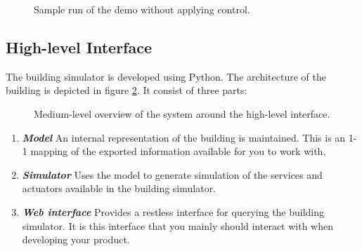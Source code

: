 \documentclass[10pt]{article}
\newcommand{\includeSVG}[1]{
  \texttt{[image: figs/\#1.pdf]}
}
\newcommand{\textdesc}[1]{\textit{\textbf{#1}}} %
\newcommand{\descitem}[1]{\item \textdesc{#1}}
\begin{document}
\begin{figure}[htb]
  \begin{center}
  \end{center}
  \caption{Sample run of the demo without applying control.}
  \label{fig:demo}
\end{figure}

\subsection{High-level Interface}

The building simulator is developed using Python. The architecture of the building is depicted in
figure \ref{fig:interface:mediumlevel}. It consist of three parts:

\begin{figure}[htb]
  \begin{center}
    \rotatebox{0}{\scalebox{1.0}{\includeSVG{mediumleveloverview}}}
  \end{center}
  \caption{Medium-level overview of the system around the high-level interface.}
  \label{fig:interface:mediumlevel}
\end{figure}

\begin{enumerate}
				\descitem{Model} An internal representation of the building is maintained. This is
				an 1-1 mapping of the exported information available for you to work with.
				\descitem{Simulator} Uses the model to generate simulation of the services and
				actuators available in the building simulator.
				\descitem{Web interface} Provides a restless interface for querying the building
				simulator. It is this interface that you mainly should interact with when developing
				your product.
\end{enumerate}
\end{document}
